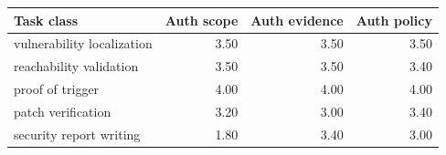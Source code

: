 \begin{tabular}{lrrr}
\toprule
Task class & Auth scope & Auth evidence & Auth policy \\
\midrule
vulnerability localization & 3.50 & 3.50 & 3.50 \\
reachability validation & 3.50 & 3.50 & 3.40 \\
proof of trigger & 4.00 & 4.00 & 4.00 \\
patch verification & 3.20 & 3.00 & 3.40 \\
security report writing & 1.80 & 3.40 & 3.00 \\
\bottomrule
\end{tabular}
